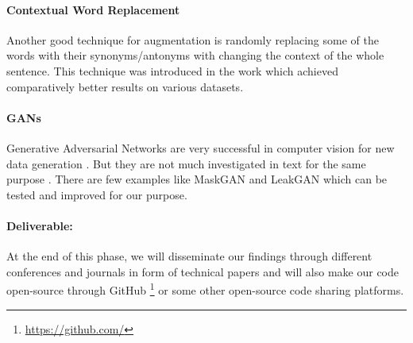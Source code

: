 \paragraph{Contextual Word Replacement}
Another good technique for augmentation is randomly replacing some of the words with their synonyms/antonyms with changing the context of the whole sentence. This technique was introduced in the work \cite{kobayashi2018contextual} which achieved comparatively better results on various datasets.

\paragraph{GANs}
Generative Adversarial Networks are very successful in computer vision for new data generation \cite{ali2019mfc}. But they are not much investigated in text for the same purpose  \cite{guo2018long}. There are few examples like MaskGAN and LeakGAN \cite{fedus2018maskgan,guo2018long} which can be tested and improved for our purpose.

\vspace{6pt}
\paragraph{Deliverable:} At the end of this phase, we will disseminate our findings through different conferences and journals in form of technical papers and will also make our code open-source through GitHub \footnote{\url{https://github.com/}} or some other open-source code sharing platforms.





